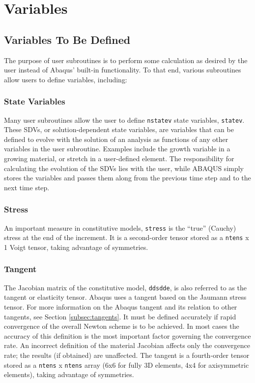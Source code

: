 \documentclass[10pt,letterpaper,oneside]{report}
\begin{document}


\section{Variables}

\subsection{Variables To Be Defined}
The purpose of user subroutines is to perform some calculation as desired by the user instead of Abaqus' built-in functionality.  To that end, various subroutines allow users to define variables, including: 

\subsubsection{State Variables}
Many user subroutines allow the user to define \texttt{nstatev} state variables, \texttt{statev}.  These SDVs, or solution-dependent state variables, are variables that can be defined to evolve with the solution of an analysis as functions of any other variables in the user subroutine.  Examples include the growth variable in a growing material, or stretch in a user-defined element.  The responsibility for calculating the evolution of the SDVs lies with the user, while ABAQUS simply stores the variables and passes them along from the previous time step and to the next time step.  

\subsubsection{Stress}
An important measure in constitutive models, \texttt{stress} is the “true” (Cauchy) stress at the end of the increment.  It is a second-order tensor stored as a \texttt{ntens} x 1 Voigt tensor, taking advantage of symmetries.

\subsubsection{Tangent}
The Jacobian matrix of the constitutive model, \texttt{ddsdde}, is also referred to as the tangent or elasticity tensor.  Abaqus uses a tangent based on the Jaumann stress tensor.  For more information on the Abaqus tangent and its relation to other tangents, see Section \ref{subsec:tangents}.  It must be defined accurately if rapid convergence of the overall Newton scheme is to be achieved. In most cases the accuracy of this definition is the most important factor governing the convergence rate. An incorrect definition of the material Jacobian affects only the convergence rate; the results (if obtained) are unaffected.  The tangent is a fourth-order tensor stored as a \texttt{ntens} x \texttt{ntens} array (6x6 for fully 3D elements, 4x4 for axisymmetric elements), taking advantage of symmetries.  
\end{document}
